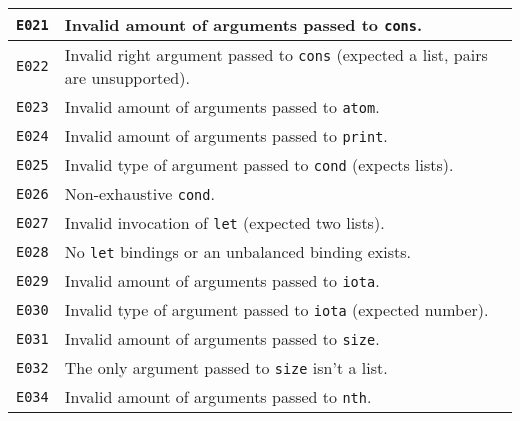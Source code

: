 \begin{longtable}{ | p{6em} | p{34em} | }
\verb|E021|          & Invalid amount of arguments passed to \verb|cons|.                                                                                             \\ \hline
\verb|E022|          & Invalid right argument passed to \verb|cons| (expected a list, pairs are unsupported).                                                         \\ \hline
\verb|E023|          & Invalid amount of arguments passed to \verb|atom|.                                                                                             \\ \hline
\verb|E024|          & Invalid amount of arguments passed to \verb|print|.                                                                                            \\ \hline
\verb|E025|          & Invalid type of argument passed to \verb|cond| (expects lists).                                                                                \\ \hline
\verb|E026|          & Non-exhaustive \verb|cond|.                                                                                                                    \\ \hline
\verb|E027|          & Invalid invocation of \verb|let| (expected two lists).                                                                                         \\ \hline
\verb|E028|          & No \verb|let| bindings or an unbalanced binding exists.                                                                                        \\ \hline
\verb|E029|          & Invalid amount of arguments passed to \verb|iota|.                                                                                             \\ \hline
\verb|E030|          & Invalid type of argument passed to \verb|iota| (expected number).                                                                              \\ \hline
\verb|E031|          & Invalid amount of arguments passed to \verb|size|.                                                                                             \\ \hline
\verb|E032|          & The only argument passed to \verb|size| isn't a list.                                                                                          \\ \hline
\verb|E034|          & Invalid amount of arguments passed to \verb|nth|.                                                                                              \\ \hline

\end{longtable}

